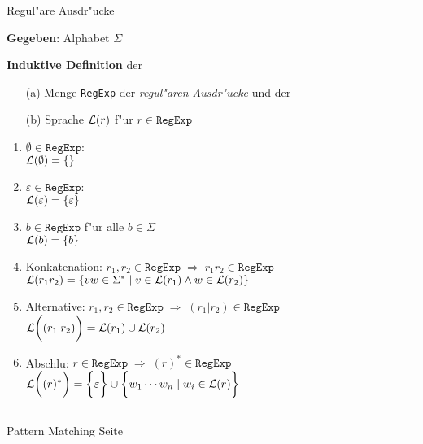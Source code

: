 
\begin{slide}{}
\normalsize

\begin{center}
Regul"are Ausdr"ucke
\end{center}
\vspace*{0.5cm}

\footnotesize
\textbf{Gegeben}: Alphabet $\Sigma$

\textbf{Induktive Definition} der 
\begin{enumerate}
\item[(a)] Menge \texttt{RegExp} der \emph{regul"aren Ausdr"ucke} und der
\item[(b)] Sprache ${\cal L}(r)$ f"ur $r \in \mathtt{RegExp}$
\end{enumerate}
\begin{enumerate}
\item $\emptyset \in \mathtt{RegExp}$: \\[0.3cm]
        \hspace*{1.3cm}  ${\cal L}(\emptyset) = \{ \}$
\item $\varepsilon \in \mathtt{RegExp}$: \\[0.3cm]
      \hspace*{1.3cm}  ${\cal L}(\varepsilon) = \{ \varepsilon \}$
\item $b \in \mathtt{RegExp}$ \quad f"ur alle $b \in \Sigma$ \\[0.3cm]
      \hspace*{1.3cm} ${\cal L}(b) = \{ b \}$
\item Konkatenation:    $r_1, r_2 \in \mathtt{RegExp}  \;\Rightarrow\; r_1r_2 \in \mathtt{RegExp}$ \\[0.3cm]
      \hspace*{1.3cm}  ${\cal L}(r_1r_2) = \{ vw \in \Sigma^* \;|\; v \in {\cal L}(r_1) \wedge w \in {\cal L}(r_2) \}$
\item Alternative: $r_1, r_2 \in \mathtt{RegExp}  \;\Rightarrow\; (r_1|r_2) \in \mathtt{RegExp}$ \\[0.3cm]
      \hspace*{1.3cm}  ${\cal L}\bigg((r_1|r_2)\bigg) = {\cal L}(r_1) \cup {\cal L}(r_2)$
\item Abschlu\3: $r \in \mathtt{RegExp}   \;\Rightarrow\; (r)^* \in \mathtt{RegExp}$ \\[0.3cm]
      \hspace*{1.3cm}  ${\cal L}\bigg((r)^*\bigg) = \bigg\{ \varepsilon \bigg\} \cup \bigg\{ w_1 \cdots w_n \;|\; w_i \in {\cal L}(r) \bigg\}$
\end{enumerate}

\vspace*{\fill}
\tiny \addtocounter{mypage}{1}
\rule{17cm}{1mm}
Pattern Matching \hspace*{\fill} Seite 
\end{slide}

